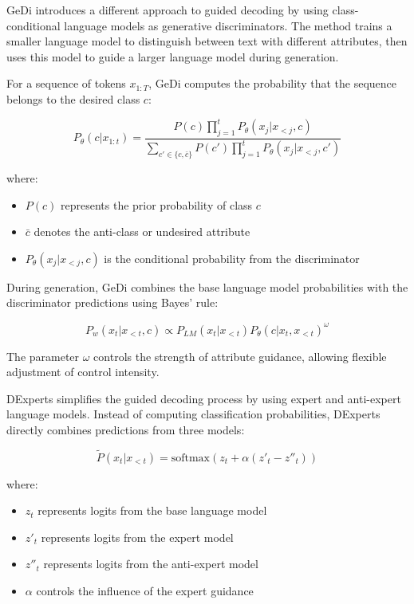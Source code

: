 GeDi introduces a different approach to guided decoding by using class-conditional language models as generative discriminators. The method trains a smaller language model to distinguish between text with different attributes, then uses this model to guide a larger language model during generation.

For a sequence of tokens $x_{1:T}$, GeDi computes the probability that the sequence belongs to the desired class $c$:

\begin{equation}
    P_\theta(c|x_{1:t}) = \frac{P(c)\prod_{j=1}^t P_\theta(x_j|x_{<j}, c)}{\sum_{c' \in \{c,\bar{c}\}} P(c')\prod_{j=1}^t P_\theta(x_j|x_{<j}, c')}
\end{equation}

where:
\begin{itemize}
    \item $P(c)$ represents the prior probability of class $c$
    \item $\bar{c}$ denotes the anti-class or undesired attribute
    \item $P_\theta(x_j|x_{<j}, c)$ is the conditional probability from the discriminator
\end{itemize}

During generation, GeDi combines the base language model probabilities with the discriminator predictions using Bayes' rule:

\begin{equation}
    P_w(x_t|x_{<t}, c) \propto P_{LM}(x_t|x_{<t})P_\theta(c|x_t, x_{<t})^\omega
\end{equation}

The parameter $\omega$ controls the strength of attribute guidance, allowing flexible adjustment of control intensity.

DExperts simplifies the guided decoding process by using expert and anti-expert language models. Instead of computing classification probabilities, DExperts directly combines predictions from three models:

\begin{equation}
    \tilde{P}(x_t|x_{<t}) = \text{softmax}(z_t + \alpha(z'_t - z''_t))
\end{equation}

where:
\begin{itemize}
    \item $z_t$ represents logits from the base language model
    \item $z'_t$ represents logits from the expert model
    \item $z''_t$ represents logits from the anti-expert model
    \item $\alpha$ controls the influence of the expert guidance
\end{itemize}

